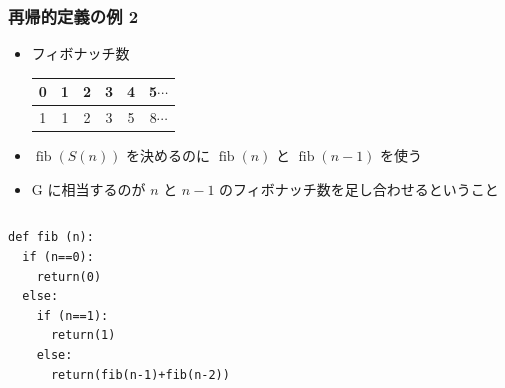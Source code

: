 \begin{frame}[fragile]
\frametitle{再帰的定義の例 2}
  \begin{itemize}
\item フィボナッチ数\\
    \begin{tabular}{c|c|c|c|c|c}
0&1&2&3&4&5$\cdots$\\
\hline
1&1&2&3&5&8$\cdots$
    \end{tabular}
\item \({\mathop{\mathrm{fib}}}(S(n))\) を決めるのに \({\mathop{\mathrm{fib}}}(n)\) と \({\mathop{\mathrm{fib}}}(n-1)\) を使う
\item G に相当するのが \(n\) と \(n-1\) のフィボナッチ数を足し合わせるということ
  \end{itemize}
  \begin{columns}[c]
    \begin{column}{0.5\textwidth}
      \begin{lstlisting}[caption={フィボナッチ数},label=fib-rec]
def fib (n):
  if (n==0):
    return(0)
  else:
    if (n==1):
      return(1)
    else:
      return(fib(n-1)+fib(n-2))
      \end{lstlisting}
    \end{column}
    \begin{column}{0.45\textwidth}
      \begin{example}[fib\((5)\)]
        \begin{center}

\end{center}
\end{example}
\end{column}
\end{columns}
\end{frame}
